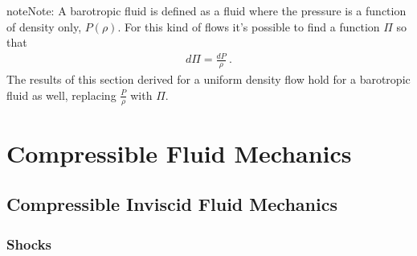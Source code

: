\documentclass[letterpaper,10pt,english]{jupyterBook}
\begin{document}
\begin{sphinxadmonition}{note}{Note:}
\sphinxAtStartPar
A barotropic fluid is defined as a fluid where the pressure is a function of density only, \(P(\rho)\). For this kind of flows it’s possible to find a function \(\Pi\) so that
\begin{equation*}
\begin{split}d \Pi = \frac{d P}{\rho} \ .\end{split}
\end{equation*}
\sphinxAtStartPar
The results of this section derived for a uniform density flow hold for a barotropic fluid as well, replacing \(\frac{P}{\rho}\) with \(\Pi\).
\end{sphinxadmonition}

\sphinxstepscope


\chapter{Compressible Fluid Mechanics}
\label{\detokenize{ch/fluids/compressible:compressible-fluid-mechanics}}\label{\detokenize{ch/fluids/compressible:fluid-mechanics-compressible}}\label{\detokenize{ch/fluids/compressible::doc}}

\section{Compressible Inviscid Fluid Mechanics}
\label{\detokenize{ch/fluids/compressible:compressible-inviscid-fluid-mechanics}}\label{\detokenize{ch/fluids/compressible:fluid-mechanics-compressible-inviscid}}

\subsection{Shocks}
\label{\detokenize{ch/fluids/compressible:shocks}}\label{\detokenize{ch/fluids/compressible:fluid-mechanics-compressible-inviscid-shocks}}
\end{document}
